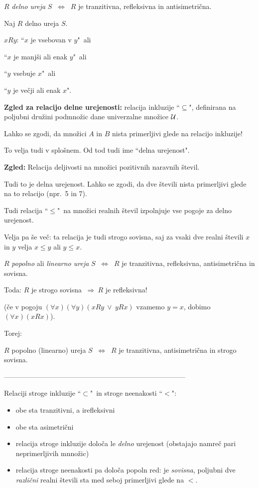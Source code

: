 \documentclass[11pt,paper=b5,DIV=13,headinclude,footinclude]{scrbook}
\def\ali {{~\vee~}}
\def\sledi {{~\Rightarrow~}}
\def\cee {{~\Leftrightarrow~}}
\begin{document}
\medskip
$R$ {\em delno ureja} $S$ $\cee$ $R$ je tranzitivna, refleksivna in antisimetrična.

\medskip
Naj $R$ delno ureja $S$.

$xRy$: ``$x$ je vsebovan v $y$"~ali

``$x$ je manjši ali enak $y$"~ali

``$y$ vsebuje $x$"~ali

``$y$ je večji ali enak $x$".

\medskip
\textbf{ Zgled za relacijo delne urejenosti:} relacija inkluzije ``$\subseteq$", definirana na poljubni družini podmnožic dane univerzalne množice ${\cal U}$.

Lahko se zgodi, da množici  $A$ in $B$ nista primerljivi glede na relacijo inkluzije!

To velja tudi v splošnem. Od tod tudi ime ``delna urejenost".

\medskip
\textbf{ Zgled:} Relacija deljivosti na množici pozitivnih naravnih števil.

Tudi to je delna urejenost. Lahko se zgodi, da dve števili nista primerljivi glede na to relacijo (npr.~5 in 7).

\bigskip
Tudi relacija ``$\le$"~na množici realnih števil izpolnjuje vse pogoje za delno urejenost.

Velja pa še več: ta relacija je tudi strogo sovisna, saj za vsaki dve realni števili $x$ in $y$ velja $x\le y$ ali $y\le x$.


\bigskip

$R$ {\em popolno} ali {\em linearno ureja} $S$ $\cee$ $R$ je tranzitivna, refleksivna,
antisimetrična in  sovisna.

\bigskip
Toda: $R$ je strogo sovisna $\sledi R$ je refleksivna!

(če v pogoju $(\forall x)(\forall y)(xRy \ali yRx)$ vzamemo $y = x$, dobimo
$(\forall x)(xRx)$).

Torej:

$R$ {popolno (linearno) ureja} $S$ $\cee$ $R$ je tranzitivna, antisimetrična in strogo sovisna.

\bigskip

------------------------------------------------------------------------------


\bigskip

\newpage
Relaciji stroge inkluzije ``$\subset$"~in stroge neenakosti ``$<$":
\begin{itemize}
  \item obe sta tranzitivni, a irefleksivni
  \item obe sta asimetrični
  \item relacija stroge inkluzije določa le {\em delno} urejenost (obstajajo namreč pari neprimerljivih mnnožic)
  \item relacija stroge neenakosti pa določa popoln red: je {\em sovisna}, poljubni dve {\em različni} realni števili sta med seboj primerljivi glede na $<$.
\end{itemize}
\end{document}
